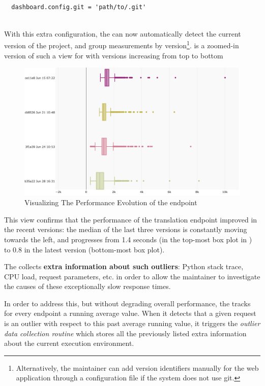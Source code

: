 \documentclass[conference]{IEEEtran}
\begin{document}
    \begin{lstlisting}[style=custompython]
  
  dashboard.config.git = 'path/to/.git'
    
  \end{lstlisting}  
 
  With this extra configuration, the \tool can now automatically detect the current version of the project, and group measurements by version\footnote{Alternatively, the maintainer can add version identifiers manually for the web application through a configuration file if the system does not use git.}.  is a zoomed-in version of such a view for \epTranslations with versions increasing from top to bottom
  
  
    \begin{figure}[h!]
      \centering
      \includegraphics[width=0.95\linewidth]{translation_endpoint_evolution_}
      \caption{Visualizing The Performance Evolution of the \epTranslations endpoint}
      \label{fig:tee}
    \end{figure}

  This view confirms that the performance of the translation endpoint improved in the recent versions: the median of the last three versions is constantly moving towards the left, and progresses from 1.4 seconds (in the top-most box plot in ) to 0.8 in the latest version (bottom-most box plot).


  \niceseparator

  The \tool collects {\bf extra information about such outliers}: Python stack trace, CPU load, request parameters, etc. in order to allow the maintainer to investigate the causes of these exceptionally slow response times. 

  In order to address this, but without degrading overall performance, the \tool tracks for every endpoint a running average value. When it detects that a given request is an outlier with respect to this past average running value, it triggers the {\em outlier data collection routine} which stores all the previously listed extra information about the current execution environment. 
\end{document}
